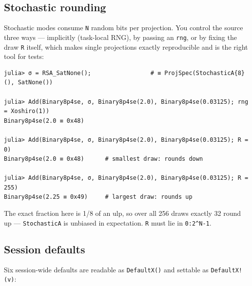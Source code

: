 \subsection{Stochastic rounding}



\label{5064376698567748197}{}


Stochastic modes consume \texttt{N} random bits per projection. You control the source three ways — implicitly (task-local RNG), by passing an \texttt{rng}, or by fixing the draw \texttt{R} itself, which makes single projections exactly reproducible and is the right tool for tests:




\begin{verbatim}
julia> σ = RSA_SatNone();                 # ≡ ProjSpec(StochasticA{8}(), SatNone())

julia> Add(Binary8p4se, σ, Binary8p4se(2.0), Binary8p4se(0.03125); rng = Xoshiro(1))
Binary8p4se(2.0 ≡ 0x48)

julia> Add(Binary8p4se, σ, Binary8p4se(2.0), Binary8p4se(0.03125); R = 0)
Binary8p4se(2.0 ≡ 0x48)      # smallest draw: rounds down

julia> Add(Binary8p4se, σ, Binary8p4se(2.0), Binary8p4se(0.03125); R = 255)
Binary8p4se(2.25 ≡ 0x49)     # largest draw: rounds up
\end{verbatim}



The exact fraction here is 1/8 of an ulp, so over all 256 draws exactly 32 round up — \texttt{StochasticA} is unbiased in expectation. \texttt{R} must lie in \texttt{0:2{\textasciicircum}N-1}.



\subsection{Session defaults}



\label{3970345369238056532}{}


Six session-wide defaults are readable as \texttt{DefaultX()} and settable as \texttt{DefaultX!(v)}:




